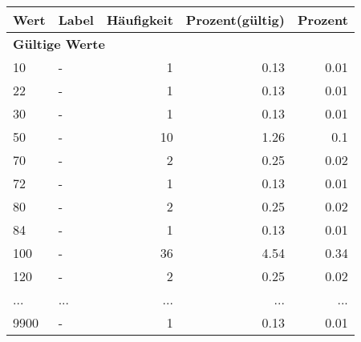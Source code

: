      \begin{longtable}{lXrrr}
     \toprule
     \textbf{Wert} & \textbf{Label} & \textbf{Häufigkeit} & \textbf{Prozent(gültig)} & \textbf{Prozent} \\
     \endhead
     \midrule
     \multicolumn{5}{l}{\textbf{Gültige Werte}}\\
        10 & \multicolumn{1}{X}{-} & %
          \num{1} &
          \num[round-mode=places,round-precision=2]{0,13} &
          \num[round-mode=places,round-precision=2]{0,01} \\
        22 & \multicolumn{1}{X}{-} & %
          \num{1} &
          \num[round-mode=places,round-precision=2]{0,13} &
          \num[round-mode=places,round-precision=2]{0,01} \\
        30 & \multicolumn{1}{X}{-} & %
          \num{1} &
          \num[round-mode=places,round-precision=2]{0,13} &
          \num[round-mode=places,round-precision=2]{0,01} \\
        50 & \multicolumn{1}{X}{-} & %
          \num{10} &
          \num[round-mode=places,round-precision=2]{1,26} &
          \num[round-mode=places,round-precision=2]{0,1} \\
        70 & \multicolumn{1}{X}{-} & %
          \num{2} &
          \num[round-mode=places,round-precision=2]{0,25} &
          \num[round-mode=places,round-precision=2]{0,02} \\
        72 & \multicolumn{1}{X}{-} & %
          \num{1} &
          \num[round-mode=places,round-precision=2]{0,13} &
          \num[round-mode=places,round-precision=2]{0,01} \\
        80 & \multicolumn{1}{X}{-} & %
          \num{2} &
          \num[round-mode=places,round-precision=2]{0,25} &
          \num[round-mode=places,round-precision=2]{0,02} \\
        84 & \multicolumn{1}{X}{-} & %
          \num{1} &
          \num[round-mode=places,round-precision=2]{0,13} &
          \num[round-mode=places,round-precision=2]{0,01} \\
        100 & \multicolumn{1}{X}{-} & %
          \num{36} &
          \num[round-mode=places,round-precision=2]{4,54} &
          \num[round-mode=places,round-precision=2]{0,34} \\
        120 & \multicolumn{1}{X}{-} & %
          \num{2} &
          \num[round-mode=places,round-precision=2]{0,25} &
          \num[round-mode=places,round-precision=2]{0,02} \\
       ... & ... & ... & ... & ... \\
        9900 & \multicolumn{1}{X}{-} & %
          \num{1} &
          \num[round-mode=places,round-precision=2]{0,13} &
          \num[round-mode=places,round-precision=2]{0,01} \\


\end{longtable}
